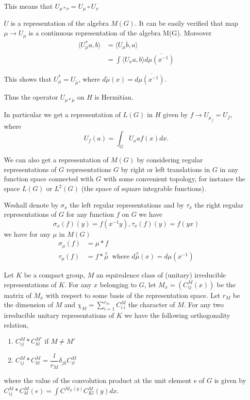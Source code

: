 This means that $U_{\mu * \nu} = U_\mu \circ U_\nu $\iec 

$U$ is a representation of the algebra 
$M(G)$. It can be easily verified
that map $\mu \to U_\mu$ is a continuous representation of the algebra
M(G). Moreover 
\begin{align*}
  \langle U^*_\mu a,b \rangle &= \langle \overline {U_\mu b, a} \rangle \\
  & = \int \langle U_x a,b \rangle d \overline{\mu (x^{-1})}
\end{align*}

This shows that $U^*_\mu = U_{\tilde{\mu}}$, where $d\tilde {\mu}(x)=d
\overline{\mu (x^{-1})}$. 

Thus the operator $U_{\mu * \tilde \mu }$ on $H$ is Hermitian.

In particular we get a representation of $L(G)$ in $H$ given by $f \to
U_{\mu _f} = U_f$, where 
$$
U_f(a)= \int_G U_x a f(x) d x.
$$

We can also get a representation of $M(G)$ by considering regular
representations of $G$ \iec representations $G$ by right or left
translations in $G$ in any function space connected with $G$ with some
convenient topology, for instance the space $L(G)$ or $L^2(G)$ (the
space of square integrable functions). 

We\pageoriginale shall denote by $\sigma_x$ the left regular representations and by
$\tau _x$ the right regular representations of $G$ \iec  for any
function $f$ on $G$ we have  
$$
\sigma_x (f)(y)=f(x^{-1}y), \tau_x (f)(y)=f(y x)
$$
we have for any $\mu $ in $M(G)$
\begin{align*}
  \sigma_\mu (f) &=\mu *f \\
  \tau _\mu (f) &= f * \overset{v}{\mu}~ \text{ where } d
  \overset{v}{\mu} (x) =d \mu (x^{-1}) 
\end{align*}

Let $K$ be a compact group, $M$ an equivalence class of (unitary)
irreducible representations of $K$. For any $x$ belonging to $G$, let
$M_x=(C^M_{ij} (x))$ be the matrix of $M_x$ with respect to some basis
of the representation  space. Let $r_M$  be the dimension of
$M$ and $\chi _M =\sum \limits^{r_m}_{i=1} C_{i~i}^{M}$ the character
of $M$. For any two irreducible unitary representations of $K$ we have
the following orthogonality relation, 
\begin{enumerate}[(1)]
\item $C^M_{ij} * C^{M'}_{kl}$  if $M \neq M'$
\item $C^M_{ij} * C^M_{kl} = \dfrac{l}{r_M} \delta_{jk} C^M_{il}$
\end{enumerate}
where the value of the convolution product at the unit element e of
$G$ is given by $C^M_{ij} * C^M_{kl} (e)= \int C^{\overline{M}_{ji}
(y)} C^M_{Kl}(y)dx$. 

